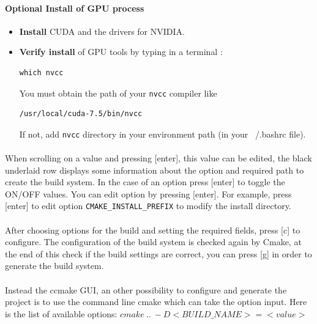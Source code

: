 \paragraph{Optional Install of GPU process}
\begin{itemize}
\item \textbf{Install} CUDA and the drivers for NVIDIA.
\item \textbf{Verify install} of GPU tools by typing in a terminal : 
\begin{lstlisting}
which nvcc
\end{lstlisting}
You must obtain the path of your \texttt{nvcc} compiler like 
\begin{lstlisting}
/usr/local/cuda-7.5/bin/nvcc
\end{lstlisting}
If not, add \texttt{nvcc} directory in your environment path (in your ~/.bashrc file). 

\end{itemize}



\paragraph{}When scrolling on a value and pressing [enter], this value can be edited, the black underlaid row displays some information about the option and required path to create the build system. In the case of an option press [enter] to toggle the ON/OFF values. You can edit option by pressing [enter]. For example, press [enter] to edit option \texttt{CMAKE\_INSTALL\_PREFIX} to modify the install directory. 
\paragraph{}After choosing options for the build and setting the required fields, press [c] to configure. The configuration of the build system is checked again by Cmake, at the end of this check if the build settings are correct, you can press [g] in order to generate the build system.

\paragraph{} Instead the ccmake GUI, an other possibility to configure and generate the project is to use the command line cmake which can take the option input. Here is the list of available options: 
\texttt{$cmake\ ..\ -D<BUILD\_NAME>=<value>$}

